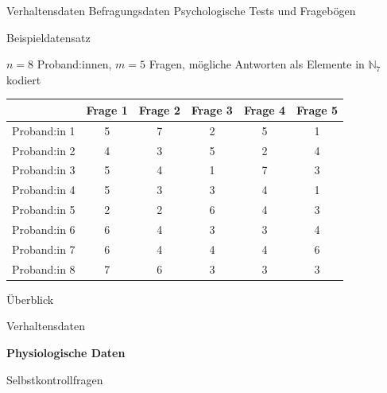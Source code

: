 \documentclass[
  8pt,
  ignorenonframetext,
]{beamer}
\begin{document}
\begin{frame}{Verhaltensdaten}
\protect\hypertarget{verhaltensdaten-4}{}
Befragungsdaten \textbar{} Psychologische Tests und Fragebögen

\small

Beispieldatensatz

\footnotesize
\vspace{1mm}

\(n = 8\) Proband:innen, \(m = 5\) Fragen, mögliche Antworten als
Elemente in \(\mathbb{N}_7\) kodiert \vspace{1mm}

\begin{longtable}[]{@{}lccccc@{}}
\toprule()
& Frage 1 & Frage 2 & Frage 3 & Frage 4 & Frage 5 \\
\midrule()
\endhead
Proband:in 1 & 5 & 7 & 2 & 5 & 1 \\
Proband:in 2 & 4 & 3 & 5 & 2 & 4 \\
Proband:in 3 & 5 & 4 & 1 & 7 & 3 \\
Proband:in 4 & 5 & 3 & 3 & 4 & 1 \\
Proband:in 5 & 2 & 2 & 6 & 4 & 3 \\
Proband:in 6 & 6 & 4 & 3 & 3 & 4 \\
Proband:in 7 & 6 & 4 & 4 & 4 & 6 \\
Proband:in 8 & 7 & 6 & 3 & 3 & 3 \\
\bottomrule()
\end{longtable}
\end{frame}

\begin{frame}{}
\protect\hypertarget{section-4}{}
\Large
{}
\vfill

Überblick

Verhaltensdaten

\textbf{Physiologische Daten}

Selbstkontrollfragen \vfill
\end{frame}
\end{document}
